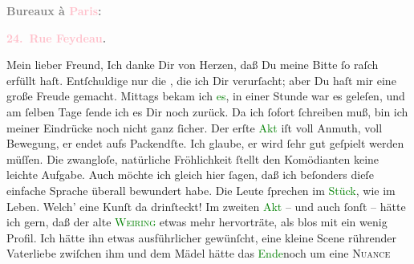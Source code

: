            \pstart
           \begin{otherlanguage}{french}\textcolor{gray}{\textbf{\textbf{Bureaux à \textcolor{pink}{Paris}{}\ledrightnote{\textcolor{pink}{Paris}}:}}}\end{otherlanguage}\pend
           \pstart
           \begin{otherlanguage}{french}\textcolor{gray}{\textbf{\textbf{\textcolor{pink}{24. Rue Feydeau}{}\ledrightnote{\textcolor{pink}{rue Feydeau}}.}}}\end{otherlanguage}\pend
           \pstart\center{}Mein lieber Freund,\pend\pstart
           Ich danke Dir von Herzen, daß Du meine Bitte ſo raſch erfüllt haſt. Entſchuldige nur
               die \label{K_L02726-12v}\label{K_L02726-12h}, die ich Dir verurſacht; aber Du haſt mir eine
               große Freude gemacht. Mittags bekam ich \textcolor{green}{es}{}, in einer Stunde war es geleſen, und am
               ſelben Tage ſende ich es Dir noch zurück.\pend
           \pstart
           Da ich ſofort ſchreiben muß, bin ich meiner Eindrücke noch nicht ganz ſicher. Der
               erſte \textcolor{green}{Akt}{} iſt voll Anmuth,
               voll Bewegung, er endet aufs {\pb}Packendſte. Ich
               glaube, er wird ſehr gut geſpielt werden müſſen. Die zwangloſe, natürliche
               Fröhlichkeit ſtellt den Komödianten keine leichte Aufgabe. Auch möchte ich gleich
               hier ſagen, daß ich beſonders dieſe einfache Sprache überall bewundert habe.  Die Leute ſprechen im \textcolor{green}{Stück}{}, wie im Leben. Welch’ eine Kunſt da
               drinſteckt! Im zweiten \textcolor{green}{Akt}{} –
               und auch ſonſt – hätte ich gern, daß der alte \textsc{\textcolor{green}{Weiring}{}} etwas mehr  hervorträte, als blos mit ein
               wenig Profil. Ich hätte ihn etwas ausführlicher gewünſcht,  eine kleine Scene rührender Vaterliebe zwiſchen ihm und
               dem Mädel hätte das \textcolor{green}{Ende}{}noch um eine \textsc{Nuance}
